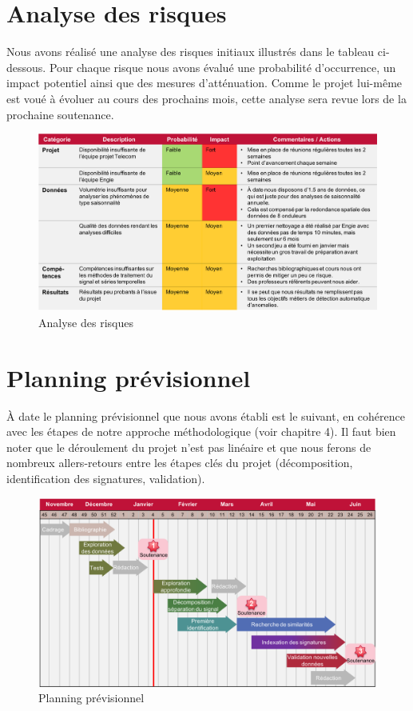 \section{Analyse des risques}
Nous avons réalisé une analyse des risques initiaux illustrés dans le tableau ci-dessous. Pour chaque risque nous avons évalué une probabilité d'occurrence, un impact potentiel ainsi que des mesures d'atténuation. Comme le projet lui-même est voué à évoluer au cours des prochains mois, cette analyse sera revue lors de la prochaine soutenance.

\begin{figure}[!ht]
\begin{center}
\includegraphics[scale=0.5]{rapport/images/Ch2_AnalyseRisques.png}
\end{center}
\caption{Analyse des risques}
\end{figure}

\section{Planning prévisionnel}
À date le planning prévisionnel que nous avons établi est le suivant, en cohérence avec les étapes de notre approche méthodologique (voir chapitre 4). Il faut bien noter que le déroulement du projet n'est pas linéaire et que nous ferons de nombreux allers-retours entre les étapes clés du projet (décomposition, identification des signatures, validation).

\begin{figure}[!ht]
\begin{center}
\includegraphics[scale=0.5]{rapport/images/Ch2_Planning.png}
\end{center}
\caption{Planning prévisionnel}
\end{figure}

